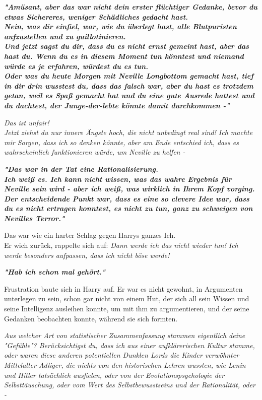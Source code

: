 {\textbf{\emph{"Amüsant, aber das war nicht dein erster flüchtiger Gedanke, bevor du etwas Sichereres, weniger Schädliches gedacht hast.\\ Nein, was dir einfiel, war, wie du überlegt hast, alle Blutpuristen aufzustellen und zu guillotinieren.}}\\ \textbf{\emph{\hfill\break Und jetzt sagst du dir, dass du es nicht ernst gemeint hast, aber das hast du. Wenn du es in diesem Moment tun könntest und niemand würde es je erfahren, würdest du es tun.}}\\ \textbf{\emph{\hfill\break Oder was du heute Morgen mit Neville Longbottom gemacht hast, tief in dir drin wusstest du, dass das falsch war, aber du hast es trotzdem getan, weil es Spaß gemacht hat und du eine gute Ausrede hattest und du dachtest, der Junge-der-lebte könnte damit durchkommen -"}}

\emph{Das ist unfair!\\ } \emph{Jetzt ziehst du nur innere Ängste hoch, die nicht unbedingt real sind! Ich machte mir Sorgen, dass ich so denken könnte, aber am Ende entschied ich, dass es wahrscheinlich funktionieren würde, um Neville zu helfen -}

\textbf{\emph{"Das war in der Tat eine Rationalisierung.\\ Ich weiß es. Ich kann nicht wissen, was das wahre Ergebnis für Neville sein wird - aber ich weiß, was wirklich in Ihrem Kopf vorging.\\ Der entscheidende Punkt war, dass es eine so clevere Idee war, dass du es nicht ertragen konntest, es nicht zu tun, ganz zu schweigen von Nevilles Terror."}}

Das war wie ein harter Schlag gegen Harrys ganzes Ich.\\ Er wich zurück, rappelte sich auf: \emph{Dann werde ich das nicht wieder tun! Ich werde besonders aufpassen, dass ich nicht böse werde!}

\textbf{\emph{"Hab ich schon mal gehört."}}

Frustration baute sich in Harry auf. Er war es nicht gewohnt, in Argumenten unterlegen zu sein, schon gar nicht von einem Hut, der sich all sein Wissen und seine Intelligenz ausleihen konnte, um mit ihm zu argumentieren, und der seine Gedanken beobachten konnte, während sie sich formten.

\emph{Aus welcher Art von statistischer Zusammenfassung stammen eigentlich deine "Gefühle"? Berücksichtigst du, dass ich aus einer aufklärerischen Kultur stamme, oder waren diese anderen potentiellen Dunklen Lords die Kinder verwöhnter Mittelalter-Adliger, die nichts von den historischen Lehren wussten, wie Lenin und Hitler tatsächlich ausfielen, oder von der Evolutionspsychologie der Selbsttäuschung, oder vom Wert des Selbstbewusstseins und der Rationalität, oder -}

}
